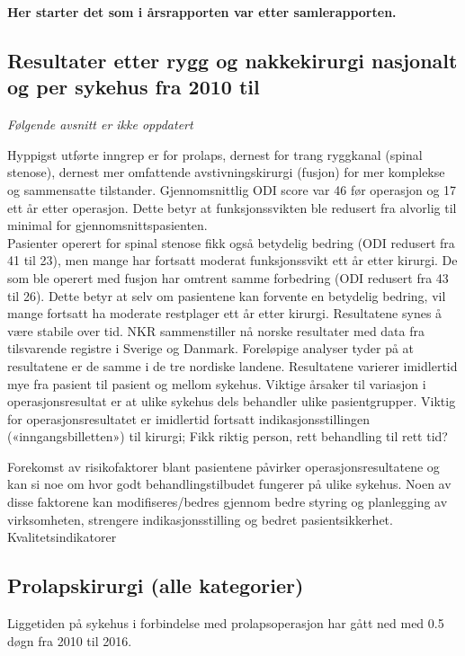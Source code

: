 \documentclass [norsk,a4paper,twoside]{article}\usepackage[]{graphicx}\usepackage[]{color}
\begin{document}
\textbf{Her starter det som i årsrapporten var etter samlerapporten.}




\subsection{ Resultater etter rygg og nakkekirurgi nasjonalt og per sykehus fra 2010 til }

\textit{Følgende avsnitt er ikke oppdatert}

Hyppigst utførte inngrep er for prolaps, dernest for trang ryggkanal (spinal stenose),
dernest mer omfattende avstivningskirurgi (fusjon) for mer komplekse og
sammensatte tilstander. Gjennomsnittlig ODI score var 46 før operasjon og 17 ett år etter
operasjon. Dette betyr at funksjonssvikten ble redusert fra alvorlig til minimal for
gjennomsnittspasienten. \\
Pasienter operert for spinal stenose fikk også
betydelig bedring (ODI redusert fra 41 til 23), men mange har fortsatt moderat
funksjonssvikt ett år etter kirurgi. De som ble operert med fusjon har
omtrent samme forbedring (ODI redusert fra 43 til 26). Dette betyr at selv om
pasientene kan forvente en betydelig bedring, vil mange fortsatt ha moderate restplager
ett år etter kirurgi. Resultatene synes å være stabile over tid. NKR
sammenstiller nå norske resultater med data fra tilsvarende registre i Sverige og
Danmark. Foreløpige analyser tyder på at resultatene er de samme i
de tre nordiske landene.
Resultatene varierer imidlertid mye fra pasient til pasient og mellom sykehus.
Viktige årsaker til variasjon i operasjonsresultat er at ulike sykehus dels behandler
ulike pasientgrupper. Viktig for operasjonsresultatet er imidlertid fortsatt
indikasjonsstillingen («inngangsbilletten») til kirurgi; Fikk riktig person, rett
behandling til rett tid?

Forekomst av risikofaktorer blant pasientene påvirker operasjonsresultatene og kan
si noe om hvor godt behandlingstilbudet fungerer på ulike sykehus. Noen av disse
faktorene kan modifiseres/bedres gjennom bedre styring og planlegging av
virksomheten, strengere indikasjonsstilling og bedret pasientsikkerhet.
Kvalitetsindikatorer


\subsection{Prolapskirurgi (alle kategorier)}



Liggetiden på sykehus i forbindelse med prolapsoperasjon har gått ned med 0.5 døgn fra 2010 til 2016.
\end{document}
